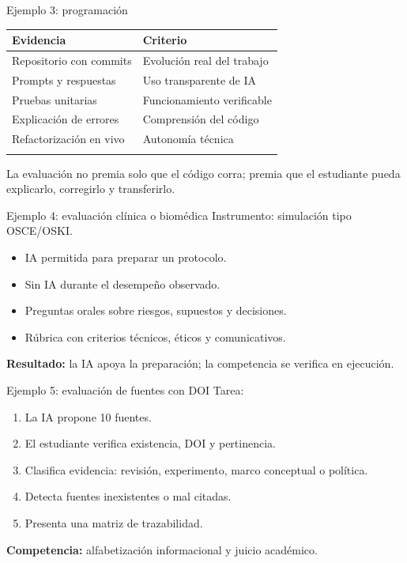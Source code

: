 \documentclass[
  ignorenonframetext,
  aspectratio=169,
  spanish,
]{beamer}
\newcounter{none} %
\providecommand{\tightlist}{%
  \setlength{\itemsep}{0pt}\setlength{\parskip}{0pt}}
\begin{document}
\begin{frame}{Ejemplo 3: programación}
\protect{}\label{ejemplo-3-programaciuxf3n}
{\def\LTcaptype{none} %
\begin{longtable}[]{@{}ll@{}}
\toprule\noalign{}
Evidencia & Criterio \\
\midrule\noalign{}
\endhead
Repositorio con commits & Evolución real del trabajo \\
Prompts y respuestas & Uso transparente de IA \\
Pruebas unitarias & Funcionamiento verificable \\
Explicación de errores & Comprensión del código \\
Refactorización en vivo & Autonomía técnica \\
\bottomrule\noalign{}
\end{longtable}
}

La evaluación no premia solo que el código corra; premia que el
estudiante pueda explicarlo, corregirlo y transferirlo.
\end{frame}

\begin{frame}{Ejemplo 4: evaluación clínica o biomédica}
\protect{}\label{ejemplo-4-evaluaciuxf3n-cluxednica-o-biomuxe9dica}
Instrumento: simulación tipo OSCE/OSKI.

\begin{itemize}
\tightlist
\item
  IA permitida para preparar un protocolo.
\item
  Sin IA durante el desempeño observado.
\item
  Preguntas orales sobre riesgos, supuestos y decisiones.
\item
  Rúbrica con criterios técnicos, éticos y comunicativos.
\end{itemize}

\textbf{Resultado:} la IA apoya la preparación; la competencia se
verifica en ejecución.
\end{frame}

\begin{frame}{Ejemplo 5: evaluación de fuentes con DOI}
\protect{}\label{ejemplo-5-evaluaciuxf3n-de-fuentes-con-doi}
Tarea:

\begin{enumerate}
\tightlist
\item
  La IA propone 10 fuentes.
\item
  El estudiante verifica existencia, DOI y pertinencia.
\item
  Clasifica evidencia: revisión, experimento, marco conceptual o
  política.
\item
  Detecta fuentes inexistentes o mal citadas.
\item
  Presenta una matriz de trazabilidad.
\end{enumerate}

\textbf{Competencia:} alfabetización informacional y juicio académico.
\end{frame}
\end{document}
